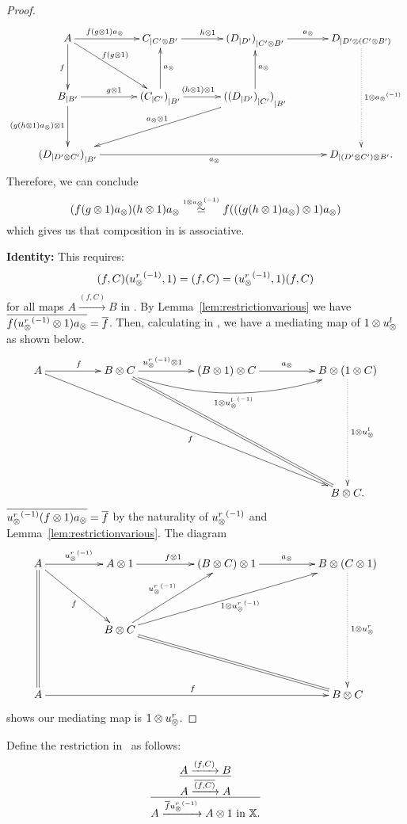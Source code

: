 \begin{proof}
  \[
    \xymatrix @C=35pt @R=35pt{
      A \ar[d]_f \ar[r]^(.4){f (g\*1) a_{\*}} \ar[dr]^(.4){f(g\*1)} &
        \xtdmn{C}{C' \* B'} \ar[r]^{h\*1}
        & \xtdmn{(\xtdmn{D}{D'})}{C' \* B'} \ar[r]^{a_{\*}}
        & \xtdmn{D}{D' \* (C' \* B')}
        \ar@{.>}[dd]^{1\*\inv{a_{\*}}}\\
      \xtdmn{B}{B'} \ar[d]_{(g (h\*1) a_{\*})\*1} \ar[r]^{g\*1}
        &\xtdmn{(\xtdmn{C}{C'})}{B'} \ar[u]_{a_{\*}} \ar[r]^(.4){(h\*1)\*1}
        & \xtdmn{(\xtdmn{(\xtdmn{D}{D'})}{C'})}{B'}
        \ar[u]_{a_\*} \ar[dll]_{a_{\*}\*1}
      \\
      \xtdmn{(\xtdmn{D}{D' \* C'})}{B'}  \ar[rrr]_{a_{\*}}
        &&& \xtdmn{D}{(D' \* C') \* B'}. %
    }
  \]
  Therefore, we can conclude
  \[
    (f(g\otimes1)a_{\otimes}) (h\otimes1)a_{\otimes} \overset{\scriptscriptstyle 1\otimes{a_{\otimes}}^{(-1)}}{\simeq} f (((g(h\otimes1)a_{\otimes})\otimes1) a_{\otimes})
  \]
  which gives us that composition in \Xt is associative.

  \textbf{Identity:} This requires:
  \[
    (f,C) ({u_{\otimes}^r}^{(-1)}, 1) = (f,C) = ({u_{\otimes}^r}^{(-1)}, 1) (f,C)
  \]
  for all maps $A\xrightarrow{(f,C)}B$ in \Xt.
  By Lemma~\ref{lem:restrictionvarious} we have
  $\overline{f ({u_{\otimes}^r}^{(-1)}\otimes1) a_{\otimes}} = \overline{f}$. Then, calculating in \X, we have a mediating map
  of $1 \otimes u_{\otimes}^l$ as shown below.
  \[
    \xymatrix @C=50pt @R=45pt{
      A \ar[r]^f \ar[ddrrr]_f&
        B \* C \ar[r]^(.4){\inv{\usr}\*1}
        \ar@/_20pt/[rr]_{1 \* \inv{\usl}}
        \ar@{=}[ddrr]
        & (B \* 1) \* C \ar[r]^{a_{\*}}
        & B \* (1 \* C) \ar@{.>}[dd]^{1 \* \usl} \\
      \\
      &&& B \* C.
    }
  \]
  $\overline{{u_{\otimes}^r}^{(-1)} (f \otimes1)  a_{\otimes}} = \overline{f}$ by the naturality of ${u_{\otimes}^r}^{(-1)}$ and
  Lemma~\ref{lem:restrictionvarious}. The diagram
  \[
    \xymatrix @C=50pt @R=45pt{
      A \ar@{=}[dd] \ar[r]^{\inv{\usr}} \ar[dr]_{f}
        &      A \* 1 \ar[r]^{f \* 1}
        & (B \* C) \* 1 \ar[r]^{a_{\*}}
        & B \* (C \* 1)\ar@{.>}[dd]^{1 \* \usr} \\
      &B\*C \ar[ur]^{\inv{\usr}} \ar[urr]_{1\*\inv{\usr}} \ar@{=}[drr]\\
      A \ar[rrr]^f &&& B \* C
    }
  \]
  shows our mediating map is $1 \otimes u_{\otimes}^r$.
\end{proof}


Define the restriction in \Xt\ as follows:
\[
  \infer{A\xrightarrow{\restr{f}  \inv{u_{\*}^r}} A\*1 \text{ in }\X.}
        {\infer{A\xrightarrow{\restr{(f,C)}}A}
               {A\xrightarrow{(f,C)}B}
        }
\]

